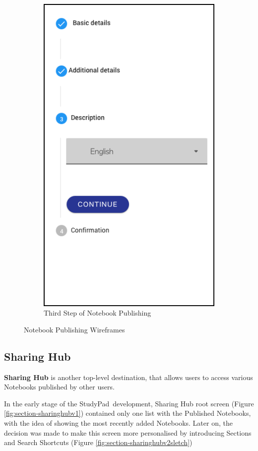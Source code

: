 \documentclass[thesis=B,english]{FITthesis}[2012/10/20]
\newcommand{\appname}{StudyPad}
\begin{document}
\begin{figure}
\begin{subfigure}{.5\textwidth}
  \includegraphics[scale=0.4]{step3}
  \caption{Third Step of Notebook Publishing }
  \label{fig:step3}
\end{subfigure}

\caption{Notebook Publishing Wireframes}
\label{fig:publishing-wireframe}
\end{figure}




\subsection{Sharing Hub}

\textbf{Sharing Hub} is another top-level destination, that allows users to access various Notebooks published by other users.

In the early stage of the \appname\ development, Sharing Hub root screen (Figure \ref{fig:section-sharinghubv1}) contained only one list with the Published Notebooks, with the idea of showing the most recently added Notebooks. Later on, the decision was made to make this screen more personalised by introducing Sections and Search Shortcuts (Figure \ref{fig:section-sharinghubv2sletch})
\end{document}
